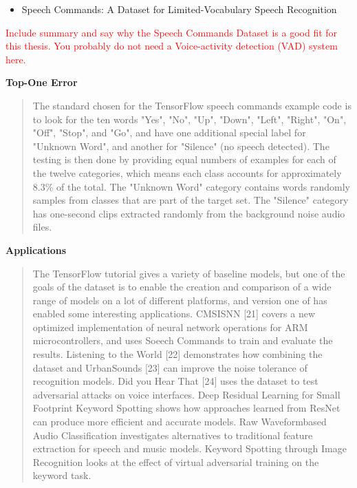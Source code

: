 \documentclass{article}
\theoremstyle{definition}
\theoremstyle{remark}
\begin{document}
\begin{itemize}
	\item Speech Commands: A Dataset for Limited-Vocabulary Speech Recognition \cite{warden2018speech}
\end{itemize}	

\textcolor{red}{Include summary and say why the Speech Commands Dataset is a good fit for this thesis. You probably do not need a Voice-activity detection (VAD) system here.}




\textbf{Top-One Error}

\begin{quote}
The standard chosen for the TensorFlow speech commands example code is to look for the ten words "Yes", "No", "Up", "Down", "Left", "Right", "On", "Off", "Stop", and "Go", and have one additional special label for "Unknown Word", and another for "Silence" (no speech detected). The testing is then done by providing equal numbers of examples for each of the twelve categories, which means each class accounts for approximately 8.3\% of the total. The "Unknown Word" category contains words randomly samples from classes that are part of the target set. The "Silence" category has one-second clips extracted randomly from the background noise audio files.
\end{quote}

\textbf{Applications}

\begin{quote}
The TensorFlow tutorial gives a variety of baseline models, but one of the goals of the dataset is to enable the creation and comparison of a wide range of models on a lot of different platforms, and version one of has enabled some interesting applications. CMSISNN [21] covers a new optimized implementation of neural network operations for ARM microcontrollers, and uses Soeech Commands to train and evaluate the results. Listening to the World [22] demonstrates how combining the dataset and UrbanSounds [23] can improve the noise tolerance of recognition models. Did you Hear That [24] uses the dataset to test adversarial attacks on voice interfaces. Deep Residual Learning for Small Footprint Keyword Spotting \cite{tang2018deep} shows how approaches learned from ResNet can produce more efficient and accurate models. Raw Waveformbased Audio Classification \cite{lee2017raw} investigates alternatives to traditional feature extraction for speech and music models. Keyword Spotting through Image Recognition \cite{gouda2018speech} looks at the effect of virtual adversarial training on the keyword task.
\end{quote}
\end{document}
